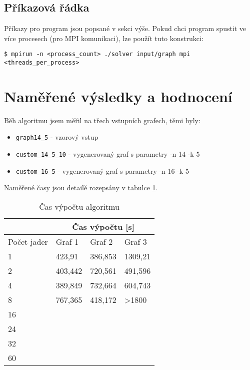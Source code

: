 \documentclass[czech]{article}
\begin{document}
\subsection{Příkazová řádka}
Příkazy pro program jsou popsané v sekci výše. Pokud chci program spustit ve více procesech (pro MPI komunikaci), lze použít tuto konstrukci:
\begin{lstlisting}[tabsize=2]
	$ mpirun -n <process_count> ./solver input/graph mpi <threads_per_process>
\end{lstlisting}

\section{Naměřené výsledky a hodnocení}
Běh algoritmu jsem měřil na třech vstupních grafech, těmi byly:
\begin{itemize}
	\item \texttt{graph14\_5} - vzorový vstup
	\item \texttt{custom\_14\_5\_10} - vygenerovaný graf s parametry -n 14 -k 5
	\item \texttt{custom\_16\_5} - vygenerovaný graf s parametry -n 16 -k 5
\end{itemize}

Naměřené časy jsou detailě rozepsány v tabulce \ref{times-table}.

\begin{table}[]
	\centering
	\caption{Čas výpočtu algoritmu}
	\label{times-table}
	\begin{tabular}{|l|lll|}
		\hline
		& \multicolumn{3}{c|}{Čas výpočtu {[}s{]}} \\ \hline
		Počet jader & Graf 1    & Graf 2   & Graf 3            \\ \hline
		1           & 423,91    & 386,853  & 1309,21           \\
		2           & 403,442   & 720,561  & 491,596           \\
		4           & 389,849   & 732,664  & 604,743           \\
		8           & 767,365   & 418,172  & \textgreater1800  \\
		16          &           &          &                   \\
		24          &           &          &                   \\
		32          &           &          &                   \\
		60          &           &          &                   \\ \hline
	\end{tabular}
\end{table}
\end{document}
